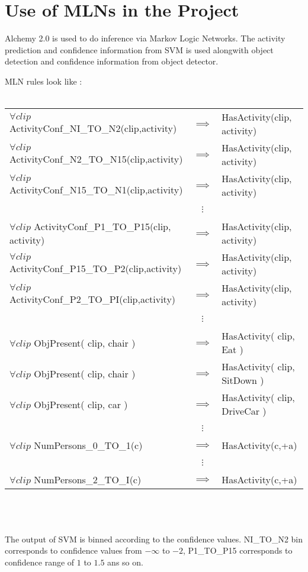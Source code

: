 \section{Use of MLNs in the Project}
Alchemy 2.0 is used to do inference via Markov Logic Networks.
The activity prediction and confidence information from SVM is used
alongwith object detection and confidence information from object detector.

MLN rules look like : \\
\\
\begin{tabular}{l c l}
	\label{MLNRule01}
	$\forall clip$ ActivityConf\_NI\_TO\_N2(clip,activity) & $\implies$ & HasActivity(clip, activity) \\
	$\forall clip$ ActivityConf\_N2\_TO\_N15(clip,activity) & $\implies$ & HasActivity(clip, activity) \\
	$\forall clip$ ActivityConf\_N15\_TO\_N1(clip,activity) & $\implies$ & HasActivity(clip, activity) \\
	~ & $\vdots$ & ~ \\
	$\forall clip$ ActivityConf\_P1\_TO\_P15(clip, activity) & $\implies$ & HasActivity(clip, activity) \\
	$\forall clip$ ActivityConf\_P15\_TO\_P2(clip,activity) & $\implies$ & HasActivity(clip, activity) \\
	$\forall clip$ ActivityConf\_P2\_TO\_PI(clip,activity) & $\implies$ & HasActivity(clip, activity) \\
	~ & $\vdots$ & ~ \\
	$\forall clip$ ObjPresent( clip, chair ) & $\implies$ & HasActivity( clip, Eat ) \\
	$\forall clip$ ObjPresent( clip, chair ) & $\implies$ & HasActivity( clip, SitDown ) \\
	$\forall clip$ ObjPresent( clip, car ) & $\implies$ & HasActivity( clip, DriveCar ) \\
	~ & $\vdots$ & ~ \\
	$\forall clip$ NumPersons\_0\_TO\_1(c) & $\implies$ & HasActivity(c,+a) \\
	~ & $\vdots$ & ~ \\
	$\forall clip$ NumPersons\_2\_TO\_I(c) & $\implies$ & HasActivity(c,+a) \\
\end{tabular}
\\
\\
\\
The output of SVM is binned according to the confidence values.
NI\_TO\_N2 bin corresponds to confidence values from $-\infty$ to $-2$, 
P1\_TO\_P15 corresponds to confidence range of $1$ to $1.5$ ans so on.

